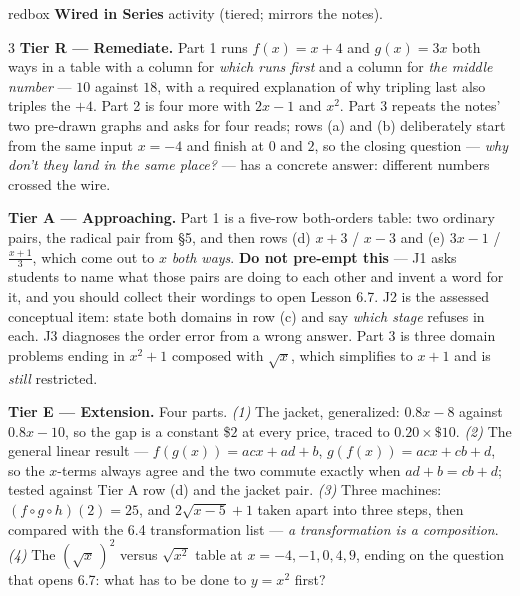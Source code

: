 \documentclass[10pt]{article}
\begin{document}
\begin{skillbox}{redbox}
\textbf{Wired in Series} activity (tiered; mirrors the notes).
\begin{multicols}{3}
\textbf{Tier R --- Remediate.} Part 1 runs $f(x)=x+4$ and $g(x)=3x$ both ways in a table with a
column for \emph{which runs first} and a column for \emph{the middle number} --- $10$ against $18$,
with a required explanation of why tripling last also triples the $+4$. Part 2 is four more with
$2x-1$ and $x^{2}$. Part 3 repeats the notes' two pre-drawn graphs and asks for four reads; rows (a)
and (b) deliberately start from the same input $x=-4$ and finish at $0$ and $2$, so the closing
question --- \emph{why don't they land in the same place?} --- has a concrete answer: different
numbers crossed the wire.

\columnbreak
\textbf{Tier A --- Approaching.} Part 1 is a five-row both-orders table: two ordinary pairs, the
radical pair from \S5, and then rows (d) $x+3$ / $x-3$ and (e) $3x-1$ / $\frac{x+1}{3}$, which come
out to $x$ \emph{both ways}. \textbf{Do not pre-empt this} --- J1 asks students to name what those
pairs are doing to each other and invent a word for it, and you should collect their wordings to
open Lesson 6.7. J2 is the assessed conceptual item: state both domains in row (c) and say
\emph{which stage} refuses in each. J3 diagnoses the order error from a wrong answer. Part 3 is
three domain problems ending in $x^{2}+1$ composed with $\sqrt{x}$, which simplifies to $x+1$ and is
\emph{still} restricted.

\columnbreak
\textbf{Tier E --- Extension.} Four parts. \emph{(1)} The jacket, generalized: $0.8x-8$ against
$0.8x-10$, so the gap is a constant \$$2$ at every price, traced to $0.20\times\$10$. \emph{(2)} The
general linear result --- $f(g(x))=acx+ad+b$, $g(f(x))=acx+cb+d$, so the $x$-terms always agree and
the two commute exactly when $ad+b=cb+d$; tested against Tier A row (d) and the jacket pair.
\emph{(3)} Three machines: $(f\circ g\circ h)(2)=25$, and $2\sqrt{x-5}+1$ taken apart into three
steps, then compared with the 6.4 transformation list --- \emph{a transformation is a composition}.
\emph{(4)} The $\left(\sqrt{x}\,\right)^{2}$ versus $\sqrt{x^{2}}$ table at $x=-4,-1,0,4,9$, ending
on the question that opens 6.7: what has to be done to $y=x^{2}$ first?
\end{multicols}
\end{skillbox}
\end{document}
